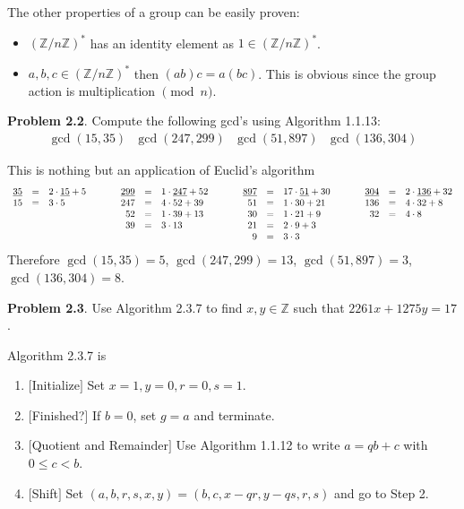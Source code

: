 \documentclass[aps,preprint,preprintnumbers,nofootinbib,showpacs,prd]{revtex4-1}
\newcommand{\ba}{\begin{array}}
\newcommand{\ea}{\end{array}}
\newcommand{\bit}{\begin{itemize}}
\newcommand{\eit}{\end{itemize}}
\newcommand{\nbea}{\begin{eqnarray*}}
\newcommand{\neea}{\end{eqnarray*}}
\begin{document}
The other properties of a group can be easily proven:
\bit
\item $(\mathbb{Z}/n\mathbb{Z})^*$ has an identity element as $1 \in (\mathbb{Z}/n\mathbb{Z})^*$.
\item $a,b,c \in (\mathbb{Z}/n\mathbb{Z})^*$ then $(ab)c = a(bc)$. This is obvious since the group action is multiplication $\pmod{n}$.
\eit

{\bf Problem 2.2}. Compute the following gcd’s using Algorithm 1.1.13:
%
\nbea
\gcd(15, 35) ~~~ \gcd(247, 299) ~~~ \gcd(51, 897) ~~~ \gcd(136, 304)
\neea
%

This is nothing but an application of Euclid's algorithm
%
\nbea
\ba{r c l   c   r c l    c    r c l    c   r c l}
\underline{35} & = & 2 \cdot \underline{15} + 5 & ~~~~~ & \underline{299} & = & 1 \cdot \underline{247} + 52 & ~~~~~ & \underline{897} & = & 17 \cdot \underline{51} + 30 & ~~~~~ & \underline{304} & = & 2 \cdot \underline{136} + 32 \\
15 & = & 3 \cdot 5 & ~~~ & 247 & = & 4 \cdot 52 + 39 & ~~~ & 51 & = & 1 \cdot 30 + 21 & ~~~ & 136 & = & 4 \cdot 32 + 8 \\
& & & ~~~ & 52 & = & 1 \cdot 39 + 13 & ~~~ & 30 & = & 1 \cdot 21 + 9 & ~~~ & 32 & = & 4 \cdot 8 \\
& & & ~~~ & 39 & = & 3 \cdot 13 & ~~~ & 21 & = & 2 \cdot 9 + 3 & ~~~ &  \\
& & & ~~~ & & & & ~~~ & 9 & = & 3 \cdot 3
\ea
\neea
%
Therefore $\gcd(15, 35) = 5$, $\gcd(247, 299) = 13$, $\gcd(51, 897) = 3$, $\gcd(136, 304) = 8$.

{\bf Problem 2.3}. Use Algorithm 2.3.7 to find $x, y \in \mathbb{Z}$ such that $2261x + 1275y = 17$.

Algorithm 2.3.7 is
\begin{enumerate}
\item $\lbrack$Initialize$\rbrack$ Set $x = 1, y = 0, r = 0, s = 1$.
\item $\lbrack$Finished?$\rbrack$ If $b = 0$, set $g = a$ and terminate.
\item $\lbrack$Quotient and Remainder$\rbrack$ Use Algorithm 1.1.12 to write $a = qb + c$ with $0 ≤ c < b$.
\item $\lbrack$Shift$\rbrack$ Set $(a, b, r, s, x, y) = (b, c, x - qr, y - qs, r, s)$ and go to Step 2.
\end{enumerate}
\end{document}

